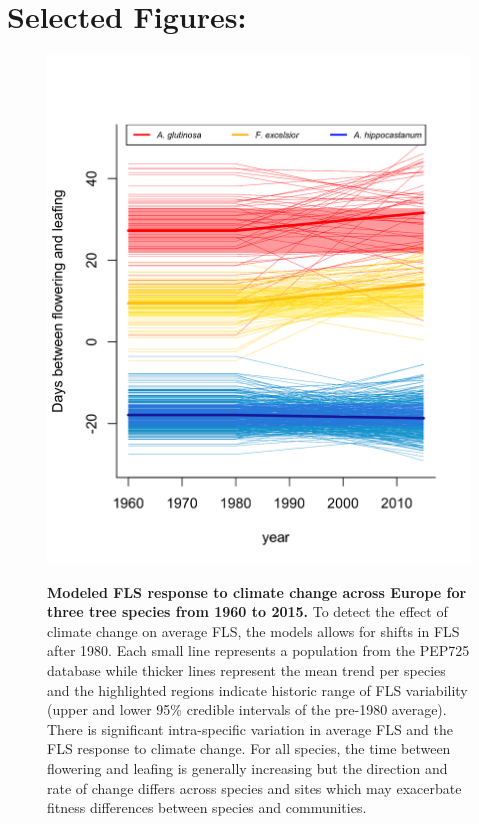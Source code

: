 \documentclass[11pt,a4paper]{article}
\begin{document}
\section*{Selected Figures:}
   \begin{figure}[ht!]
   \centering
 \includegraphics[width=.6\textwidth]{..//figure/FLS_climate_change.png}\\
\caption{\textbf{Modeled FLS response to climate change across Europe for three tree species from 1960 to 2015.} To detect the effect of climate change on average FLS, the models allows for shifts in FLS after 1980. Each small line represents a population from the PEP725 database while thicker lines represent the mean trend per species and the highlighted regions indicate historic range of FLS variability (upper and lower 95\% credible intervals of the pre-1980 average). There is significant intra-specific variation in average FLS and the FLS response to climate change. For all species, the time between flowering and leafing is generally increasing but the direction and rate of change differs across species and sites which may exacerbate fitness differences between species and communities.}
    \label{fig:Figure 1}
    \end{figure}
\newpage

\end{document}

